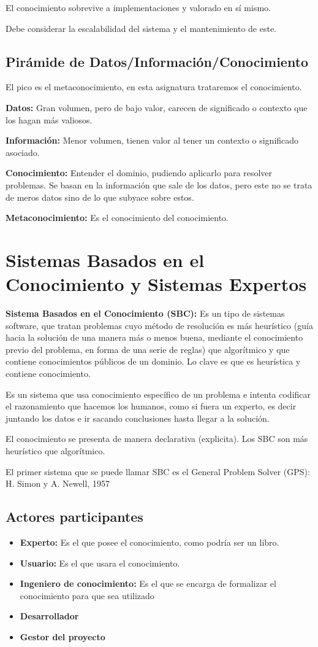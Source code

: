 \documentclass[12pt, twoside, openright]{report} %
\begin{document}
El conocimiento sobrevive a implementaciones y valorado en sí mismo.

Debe considerar la escalabilidad del sistema y el mantenimiento de este.

\subsection{Pirámide de Datos/Información/Conocimiento}
El pico es el metaconocimiento, en esta asignatura trataremos el conocimiento.

\textbf{Datos:} Gran volumen, pero de bajo valor, carecen de significado o contexto que los hagan más valiosos.

\textbf{Información:} Menor volumen, tienen valor al tener un contexto o significado asociado.

\textbf{Conocimiento:} Entender el dominio, pudiendo aplicarlo para resolver problemas. Se basan en la información que sale de los datos, pero este no se trata de meros datos sino de lo que subyace sobre estos.

\textbf{Metaconocimiento:} Es el conocimiento del conocimiento.

\section{Sistemas Basados en el Conocimiento y Sistemas Expertos}

\textbf{Sistema Basados en el Conocimiento (SBC):} Es un tipo de sistemas software, que tratan problemas cuyo método de resolución es más heurístico (guía hacia la solución de una manera más o menos buena, mediante el conocimiento previo del problema, en forma de una serie de reglas) que algorítmico y que contiene conocimientos públicos de un dominio. Lo clave es que es heurística y contiene conocimiento.

Es un sistema que usa conocimiento específico de un problema e intenta codificar el razonamiento que hacemos los humanos, como si fuera un experto, es decir juntando los datos e ir sacando conclusiones hasta llegar a la solución.

El conocimiento se presenta de manera declarativa (explicita). Los SBC son más heurístico que algorítmico.

El primer sistema que se puede llamar SBC es el General Problem Solver (GPS): H. Simon y A. Newell, 1957

\subsection{Actores participantes}
\begin{itemize}
	\item \textbf{Experto:} Es el que posee el conocimiento, como podría ser un libro.
	\item \textbf{Usuario:} Es el que usara el conocimiento.
	\item \textbf{Ingeniero de conocimiento:} Es el que se encarga de formalizar el conocimiento para que sea utilizado \item \textbf{Desarrollador}
	\item \textbf{Gestor del proyecto}
\end{itemize}
\end{document}
